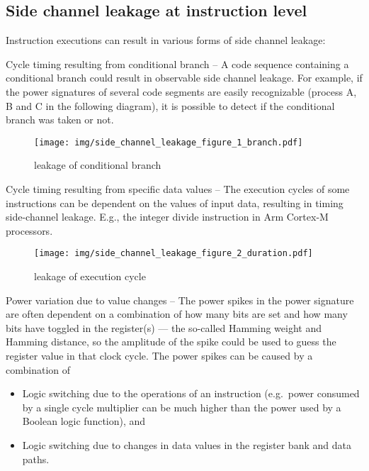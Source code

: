 \documentclass[
  a4paper,
]{report}
\providecommand{\tightlist}{%
  \setlength{\itemsep}{0pt}\setlength{\parskip}{0pt}}
\begin{document}
\subsection{Side channel leakage at instruction
level}\label{side-channel-leakage-at-instruction-level}

Instruction executions can result in various forms of side channel
leakage:

Cycle timing resulting from conditional branch -- A code sequence
containing a conditional branch could result in observable side channel
leakage. For example, if the power signatures of several code segments
are easily recognizable (process A, B and C in the following diagram),
it is possible to detect if the conditional branch was taken or not.

\begin{figure}
\centering
\texttt{[image: img/side\_channel\_leakage\_figure\_1\_branch.pdf]}
\caption{leakage of conditional branch}
\end{figure}

Cycle timing resulting from specific data values -- The execution cycles
of some instructions can be dependent on the values of input data,
resulting in timing side-channel leakage. E.g., the integer divide
instruction in Arm Cortex-M processors.

\begin{figure}
\centering
\texttt{[image: img/side\_channel\_leakage\_figure\_2\_duration.pdf]}
\caption{leakage of execution cycle}
\end{figure}

Power variation due to value changes -- The power spikes in the power
signature are often dependent on a combination of how many bits are set
and how many bits have toggled in the register(s) --- the so-called
Hamming weight and Hamming distance, so the amplitude of the spike could
be used to guess the register value in that clock cycle. The power
spikes can be caused by a combination of

\begin{itemize}
\tightlist
\item
  Logic switching due to the operations of an instruction (e.g.~power
  consumed by a single cycle multiplier can be much higher than the
  power used by a Boolean logic function), and
\item
  Logic switching due to changes in data values in the register bank and
  data paths.
\end{itemize}
\end{document}
